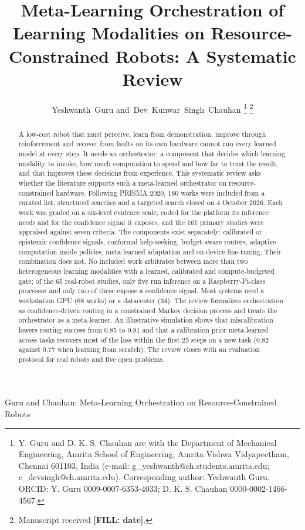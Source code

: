 \documentclass[journal]{IEEEtran}
\newcommand{\fillin}[1]{{\color{red}\bfseries [FILL: #1]}}
\begin{document}
\title{Meta-Learning Orchestration of Learning Modalities on Resource-Constrained Robots: A Systematic Review}

\author{Yeshwanth~Guru
        and~Dev~Kunwar~Singh~Chauhan%
\thanks{Y. Guru and D. K. S. Chauhan are with the Department of Mechanical Engineering, Amrita School of Engineering, Amrita Vishwa Vidyapeetham, Chennai 601103, India (e-mail: g\_yeshwanth@ch.students.amrita.edu; c\_devsingh@ch.amrita.edu). Corresponding author: Yeshwanth Guru. ORCID: Y. Guru 0009-0007-6353-4033; D. K. S. Chauhan 0000-0002-1466-4567.}%
\thanks{Manuscript received \fillin{date}.}}

%
{Guru and Chauhan: Meta-Learning Orchestration on Resource-Constrained Robots}

\maketitle

\begin{abstract}
A low-cost robot that must perceive, learn from demonstration, improve through reinforcement and recover from faults on its own hardware cannot run every learned model at every step. It needs an orchestrator: a component that decides which learning modality to invoke, how much computation to spend and how far to trust the result, and that improves these decisions from experience. This systematic review asks whether the literature supports such a meta-learned orchestrator on resource-constrained hardware. Following PRISMA 2020, 180 works were included from a curated list, structured searches and a targeted search closed on 4 October 2026. Each work was graded on a six-level evidence scale, coded for the platform its inference needs and for the confidence signal it exposes, and the 161 primary studies were appraised against seven criteria. The components exist separately: calibrated or epistemic confidence signals, conformal help-seeking, budget-aware routers, adaptive computation inside policies, meta-learned adaptation and on-device fine-tuning. Their combination does not. No included work arbitrates between more than two heterogeneous learning modalities with a learned, calibrated and compute-budgeted gate; of the 65 real-robot studies, only five run inference on a Raspberry-Pi-class processor and only two of these expose a confidence signal. Most systems need a workstation GPU (68 works) or a datacenter (34). The review formalizes orchestration as confidence-driven routing in a constrained Markov decision process and treats the orchestrator as a meta-learner. An illustrative simulation shows that miscalibration lowers routing success from 0.85 to 0.81 and that a calibration prior meta-learned across tasks recovers most of the loss within the first 25 steps on a new task (0.82 against 0.77 when learning from scratch). The review closes with an evaluation protocol for real robots and five open problems.
\end{abstract}
\end{document}
